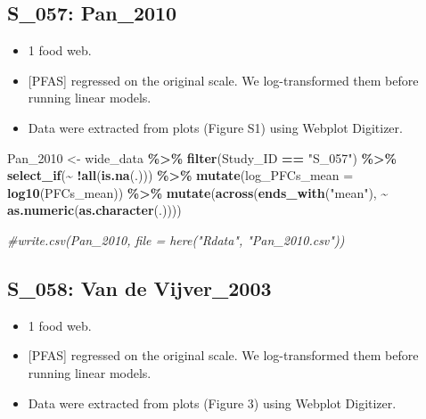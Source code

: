 \documentclass[
]{article}
\newenvironment{Shaded}{\begin{snugshade}}{\end{snugshade}}
\newcommand{\AttributeTok}[1]{\textcolor[rgb]{0.13,0.29,0.53}{#1}}
\newcommand{\CommentTok}[1]{\textcolor[rgb]{0.56,0.35,0.01}{\textit{#1}}}
\newcommand{\FunctionTok}[1]{\textcolor[rgb]{0.13,0.29,0.53}{\textbf{#1}}}
\newcommand{\NormalTok}[1]{#1}
\newcommand{\OtherTok}[1]{\textcolor[rgb]{0.56,0.35,0.01}{#1}}
\newcommand{\SpecialCharTok}[1]{\textcolor[rgb]{0.81,0.36,0.00}{\textbf{#1}}}
\newcommand{\StringTok}[1]{\textcolor[rgb]{0.31,0.60,0.02}{#1}}
\providecommand{\tightlist}{%
  \setlength{\itemsep}{0pt}\setlength{\parskip}{0pt}}
\begin{document}
\subsection{S\_057: Pan\_2010}\label{s_057-pan_2010}

\begin{itemize}
\tightlist
\item
  1 food web.
\item
  {[}PFAS{]} regressed on the original scale. We log-transformed them
  before running linear models.
\item
  Data were extracted from plots (Figure S1) using Webplot Digitizer.
\end{itemize}

\begin{Shaded}
\begin{Highlighting}[]
\NormalTok{Pan\_2010 }\OtherTok{\textless{}{-}}\NormalTok{ wide\_data }\SpecialCharTok{\%\textgreater{}\%} 
  \FunctionTok{filter}\NormalTok{(Study\_ID }\SpecialCharTok{==} \StringTok{"S\_057"}\NormalTok{) }\SpecialCharTok{\%\textgreater{}\%}
  \FunctionTok{select\_if}\NormalTok{(}\SpecialCharTok{\textasciitilde{}} \SpecialCharTok{!}\FunctionTok{all}\NormalTok{(}\FunctionTok{is.na}\NormalTok{(.))) }\SpecialCharTok{\%\textgreater{}\%}
  \FunctionTok{mutate}\NormalTok{(}\AttributeTok{log\_PFCs\_mean =} \FunctionTok{log10}\NormalTok{(PFCs\_mean)) }\SpecialCharTok{\%\textgreater{}\%} 
  \FunctionTok{mutate}\NormalTok{(}\FunctionTok{across}\NormalTok{(}\FunctionTok{ends\_with}\NormalTok{(}\StringTok{"mean"}\NormalTok{), }\SpecialCharTok{\textasciitilde{}} \FunctionTok{as.numeric}\NormalTok{(}\FunctionTok{as.character}\NormalTok{(.))))}

\CommentTok{\#write.csv(Pan\_2010, file = here("Rdata", "Pan\_2010.csv"))}
\end{Highlighting}
\end{Shaded}

\subsection{S\_058: Van de Vijver\_2003}\label{s_058-van-de-vijver_2003}

\begin{itemize}
\tightlist
\item
  1 food web.
\item
  {[}PFAS{]} regressed on the original scale. We log-transformed them
  before running linear models.
\item
  Data were extracted from plots (Figure 3) using Webplot Digitizer.
\end{itemize}
\end{document}
